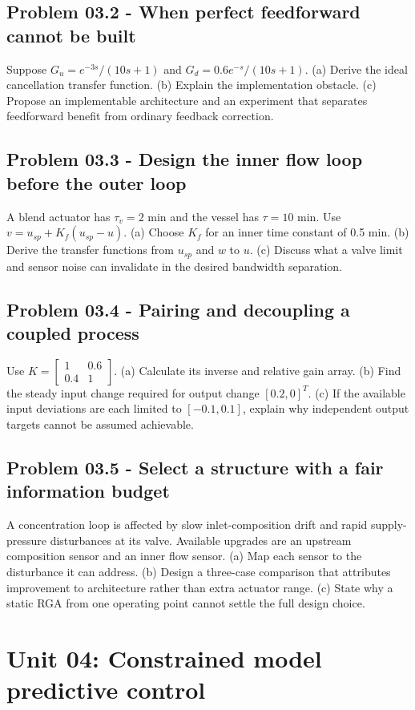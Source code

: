\documentclass[11pt,a4paper]{article}
\begin{document}
\subsection{Problem 03.2 - When perfect feedforward cannot be built}
Suppose $G_u=e^{-3s}/(10s+1)$ and $G_d=0.6e^{-s}/(10s+1)$. (a) Derive the ideal cancellation transfer function. (b) Explain the implementation obstacle. (c) Propose an implementable architecture and an experiment that separates feedforward benefit from ordinary feedback correction.

\subsection{Problem 03.3 - Design the inner flow loop before the outer loop}
A blend actuator has $\tau_v=2$ min and the vessel has $\tau=10$ min. Use $v=u_{sp}+K_f(u_{sp}-u)$. (a) Choose $K_f$ for an inner time constant of 0.5 min. (b) Derive the transfer functions from $u_{sp}$ and $w$ to $u$. (c) Discuss what a valve limit and sensor noise can invalidate in the desired bandwidth separation.

\subsection{Problem 03.4 - Pairing and decoupling a coupled process}
Use $K=\begin{bmatrix}1&0.6\\0.4&1\end{bmatrix}$. (a) Calculate its inverse and relative gain array. (b) Find the steady input change required for output change $[0.2,0]^T$. (c) If the available input deviations are each limited to $[-0.1,0.1]$, explain why independent output targets cannot be assumed achievable.

\subsection{Problem 03.5 - Select a structure with a fair information budget}
A concentration loop is affected by slow inlet-composition drift and rapid supply-pressure disturbances at its valve. Available upgrades are an upstream composition sensor and an inner flow sensor. (a) Map each sensor to the disturbance it can address. (b) Design a three-case comparison that attributes improvement to architecture rather than extra actuator range. (c) State why a static RGA from one operating point cannot settle the full design choice.


\clearpage\section{Unit 04: Constrained model predictive control}
\end{document}
